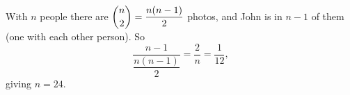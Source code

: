 With $n$ people there are $\dbinom n2=\dfrac{n(n-1)}{2}$ photos, and John is in $n-1$ of them (one with each other person). So
\[
\dfrac{n-1}{\dfrac{n(n-1)}{2}}=\dfrac{2}{n}=\dfrac{1}{12},
\]
giving $n=\boxed{24}$.
